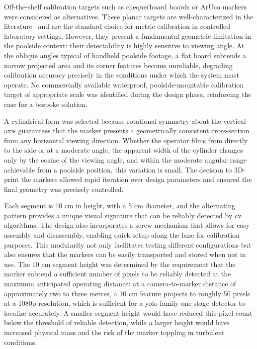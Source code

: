 Off-the-shelf calibration targets such as chequerboard boards or ArUco markers were considered
as alternatives. These planar targets are well-characterized in the literature~\cite{hartley2003multiple}
and are the standard choice for metric calibration in controlled laboratory settings. However,
they present a fundamental geometric limitation in the poolside context: their detectability
is highly sensitive to viewing angle. At the oblique angles typical of handheld poolside
footage, a flat board subtends a narrow projected area and its corner features become
unreliable, degrading calibration accuracy precisely in the conditions under which the system
must operate. No commercially available waterproof, poolside-mountable calibration target of
appropriate scale was identified during the design phase, reinforcing the case for a bespoke
solution.

A cylindrical form was selected because rotational symmetry about the vertical axis guarantees
that the marker presents a geometrically consistent cross-section from any horizontal viewing
direction. Whether the operator films from directly to the side or at a moderate angle, the
apparent width of the cylinder changes only by the cosine of the viewing angle, and within the
moderate angular range achievable from a poolside position, this variation is small. The
decision to 3D-print the markers allowed rapid iteration over design parameters and ensured
the final geometry was precisely controlled.

Each segment is 10 cm in height, with a 5 cm diameter, and the alternating pattern provides a
unique visual signature that can be reliably detected by \gls{cv} algorithms. The design
also incorporates a screw mechanism that allows for easy assembly and disassembly, enabling
quick setup along the lane for calibration purposes. This modularity not only facilitates
testing different configurations but also ensures that the markers can be easily transported
and stored when not in use. The 10 cm segment height was determined by the requirement that
the marker subtend a sufficient number of pixels to be reliably detected at the maximum
anticipated operating distance: at a camera-to-marker distance of approximately two to three
metres, a 10 cm feature projects to roughly 50 pixels at a 1080p resolution, which is
sufficient for a \gls{yolo}-family one-stage detector to localize accurately. A smaller segment
height would have reduced this pixel count below the threshold of reliable detection, while a
larger height would have increased physical mass and the risk of the marker toppling in
turbulent conditions.

